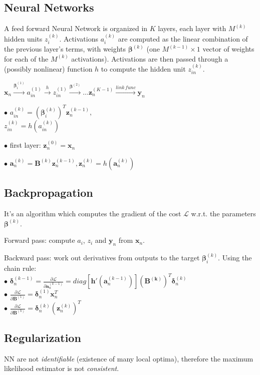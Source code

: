 \documentclass[10pt,a4paper,landscape]{article}
\renewcommand{\bf}[1]{\ensuremath{\mathbf{#1}}}
\newcommand{\bbeta}{\boldsymbol\beta}
\newcommand{\bdelta}{\boldsymbol\delta}
\begin{document}
\begin{multicols*}{6}
\section{Neural Networks}
A feed forward Neural Network is organized in $K$ layers, each layer with $M^{(k)}$ hidden units $z_i^{(k)}$. Activations $a_i^{(k)}$ are computed as the linear combination of the previous layer's terms, with weights $\bbeta^{(k)}$ (one $M^{(k-1)} \times 1$ vector of weights for each of the $M^{(k)}$ activations). Activations are then passed through a (possibly nonlinear) function $h$ to compute the hidden unit $z_{in}^{(k)}$.

$\bf{x}_n \xrightarrow{\bbeta_i^{(1)}} a_{in}^{(1)} \xrightarrow{h} z_{in}^{(1)} \xrightarrow{\bbeta^{(2)}} \dots \bf{z}_n^{(K-1)} \xrightarrow{link \,func} \bf{y}_n$

$\bullet$ $a_{in}^{(k)}=(\bbeta_i^{(k)})^T\bf{z}_n^{(k-1)},$\\
$z_{in}^{(k)}=h(a_{in}^{(k)})$

$\bullet$ first layer: $\bf{z}_n^{(0)}=\bf{x}_n$

$\bullet$ $\bf{a}_n^{(k)}=\bf{B}^{(k)}\bf{z}_n^{(k-1)}, \bf{z}_n^{(k)}=h(\bf{a}_n^{(k)})$

\subsection{Backpropagation}
It's an algorithm which computes the gradient of the cost $\mathcal{L}$ w.r.t. the parameters $\bbeta^{(k)}$.

Forward pass: compute $a_i$, $z_i$ and $\bf{y}_n$ from $\bf{x}_n$.

Backward pass: work out derivatives from outputs to the target $\bbeta_i^{(k)}$. Using the chain rule:\\
$\bullet$ $\bdelta_n^{(k-1)} = \frac{\partial \mathcal{L}}{\partial \bf{a}_n^{(k-1)}} = diag[ \bf{h}'(\bf{a}_n^{(k-1)}) ] (\bf{B^{(k)}})^T  \bdelta_n^{(k)}$\\
$\bullet$ $\frac{\partial \mathcal{L}}{\partial \bf{B}^{(1)}} = \bdelta_n^{(1)} \bf{x}_n^T$\\
$\bullet$ $\frac{\partial \mathcal{L}}{\partial \bf{B}^{(k)}} = \bdelta_n^{(k)} (\bf{z}_n^{(k)})^T$

\subsection{Regularization}
NN are not \textit{identifiable} (existence of many local optima), therefore the maximum likelihood estimator is not \textit{consistent}.


\end{multicols*}
\end{document}

